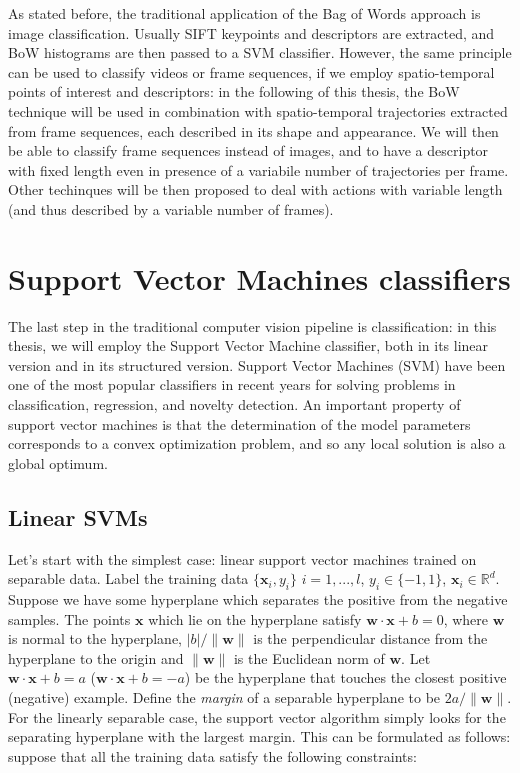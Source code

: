 As stated before, the traditional application of the Bag of Words approach is image classification. Usually SIFT keypoints and descriptors are extracted, and BoW histograms are then passed to a SVM classifier. However, the same principle can be used to classify videos or frame sequences, if we employ spatio-temporal points of interest and descriptors: in the following of this thesis, the BoW technique will be used in combination with spatio-temporal trajectories extracted from frame sequences, each described in its shape and appearance. We will then be able to classify frame sequences instead of images, and to have a descriptor with fixed length even in presence of a variabile number of trajectories per frame. Other techinques will be then proposed to deal with actions with variable length (and thus described by a variable number of frames).


\section{Support Vector Machines classifiers}
The last step in the traditional computer vision pipeline is classification: in this thesis, we will employ the Support Vector Machine classifier, both in its linear version and in its structured version. Support Vector Machines (SVM) have been one of the most popular classifiers in recent years for solving problems in classification, regression, and novelty detection. An important property of support vector machines is that the determination of the model parameters corresponds to a convex optimization problem, and so any local solution is also a global optimum.

\subsection{Linear SVMs}
Let's start with the simplest case: linear support vector machines trained on separable data. Label the training data $\{ \mathbf{x}_i, y_i\}$ $i=1, ..., l$, $y_i \in \{-1,1\}$, $\mathbf{x}_i \in \mathbb{R}^d$. Suppose we have some hyperplane which separates the positive from the negative samples. The points $\mathbf{x}$ which lie on the hyperplane satisfy $\mathbf{w} \cdot \mathbf{x} + b = 0$, where $\mathbf{w}$ is normal to the hyperplane, $|b|/\|\mathbf{w}\|$ is the perpendicular distance from the hyperplane to the origin and $\|\mathbf{w}\|$ is the Euclidean norm of $\mathbf{w}$. Let $\mathbf{w} \cdot \mathbf{x} +b = a$ ($\mathbf{w} \cdot \mathbf{x} +b = -a$) be the hyperplane that touches the closest positive (negative) example. Define the \textit{margin} of a separable hyperplane to be $2a / \| \mathbf{w} \|$. For the linearly separable case, the support vector algorithm simply looks for the separating hyperplane with the largest margin. This can be formulated as follows: suppose that all the training data satisfy the following constraints:

